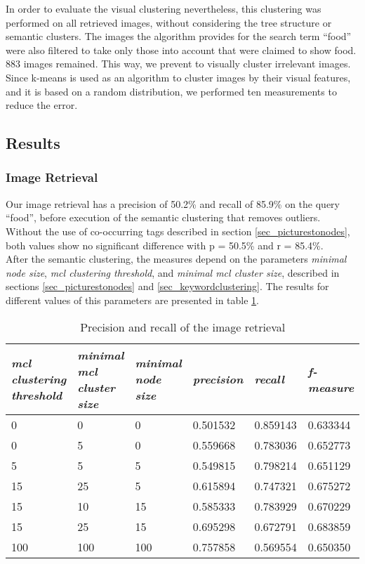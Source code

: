 In order to evaluate the visual clustering nevertheless, this clustering was performed on all retrieved images, without considering the tree structure or semantic clusters.
The images the algorithm provides for the search term ``food'' were also filtered to take only those into account that were claimed to show food. 883 images remained.
This way, we prevent to visually cluster irrelevant images.\\
Since k-means is used as an algorithm to cluster images by their visual features, and it is based on a random distribution, we performed ten measurements to reduce the error.

\subsection{Results}
\label{sec_results}

\subsubsection{Image Retrieval}

Our image retrieval has a precision of 50.2\% and recall of 85.9\% on the query ``food'', before execution of the semantic clustering that removes outliers. Without the use of co-occurring tags described in section \ref{sec_picturestonodes}, both values show no significant difference with p = 50.5\% and r = 85.4\%.\\
After the semantic clustering, the measures depend on the  parameters \emph{minimal node size}, \emph{mcl clustering threshold}, and \emph{minimal mcl cluster size}, described in sections \ref{sec_picturestonodes} and \ref{sec_keywordclustering}. The results for different values of this parameters are presented in table \ref{tab_retrievalevaluation}.\\

\begin{table}[h]
   \begin{tabular}{| p{2.2cm}| p{2.2cm}| p{2cm} || p{2cm} | p{2cm} | p{2cm} |}
    \hline
    \emph{mcl clustering threshold} & \emph{minimal mcl cluster size} & \emph{minimal node size} & \emph{precision} & \emph{recall} & \emph{f-measure} \\ \hline
    0 	& 0 	& 0 & 0.501532 & 0.859143 & 0.633344 \\ \hline
    0 	& 5 	& 0 & 0.559668 & 0.783036 & 0.652773 \\ \hline
    5 	& 5 	& 5 & 0.549815 & 0.798214 & 0.651129 \\ \hline
    15 	& 25 &  5 & 0.615894 & 0.747321 & 0.675272 \\ \hline
    15 	& 10 & 15 & 0.585333 & 0.783929 & 0.670229 \\ \hline
    15 	& 25 & 15 & 0.695298 & 0.672791 & 0.683859 \\ \hline
    	100 	& 100 & 100 & 0.757858 & 0.569554 & 0.650350 \\ \hline
    \end{tabular}
    \caption{Precision and recall of the image retrieval}
	\label{tab_retrievalevaluation}
\end{table}


